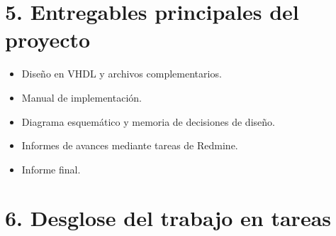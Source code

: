 \documentclass[11pt]{charter}
\begin{document}
\section{5. Entregables principales del proyecto}
\label{sec:entregables}

\begin{itemize}
\item Diseño en VHDL y archivos complementarios.
\item Manual de implementación.
\item Diagrama esquemático y memoria de decisiones de diseño.
\item Informes de avances mediante tareas de Redmine.
\item Informe final.
\end{itemize}

\section{6. Desglose del trabajo en tareas}
\label{sec:wbs}
\end{document}
